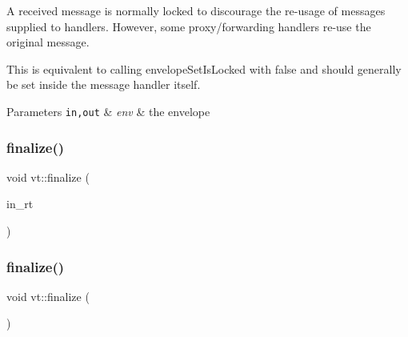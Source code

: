 A received message is normally locked to discourage the re-\/usage of messages supplied to handlers. However, some proxy/forwarding handlers re-\/use the original message.

This is equivalent to calling {\ttfamily envelope\+Set\+Is\+Locked} with false and should generally be set inside the message handler itself.


\begin{DoxyParams}[1]{Parameters}
\mbox{\tt in,out}  & {\em env} & the envelope \\
\hline
\end{DoxyParams}
\mbox{\label{namespacevt_a540d90dbd6e97b69f1dcbc9ee9314cff}} 
\subsubsection{\texorpdfstring{finalize()}{finalize()}\hspace{0.1cm}{\footnotesize\ttfamily [1/2]}}
{\footnotesize\ttfamily void vt\+::finalize (\begin{DoxyParamCaption}\item[{\hyperlink{namespacevt_a0ce60e0299d8fa32223b3b9ffa0af466}{Runtime\+Ptr\+Type}}]{in\+\_\+rt }\end{DoxyParamCaption})}

\mbox{\label{namespacevt_ae8e663109f635cbeca94c39b89b4683c}} 
\subsubsection{\texorpdfstring{finalize()}{finalize()}\hspace{0.1cm}{\footnotesize\ttfamily [2/2]}}
{\footnotesize\ttfamily void vt\+::finalize (\begin{DoxyParamCaption}{ }\end{DoxyParamCaption})}

\mbox{\label{namespacevt_aaa266774ea8339c58be0202b00fafa62}} 
